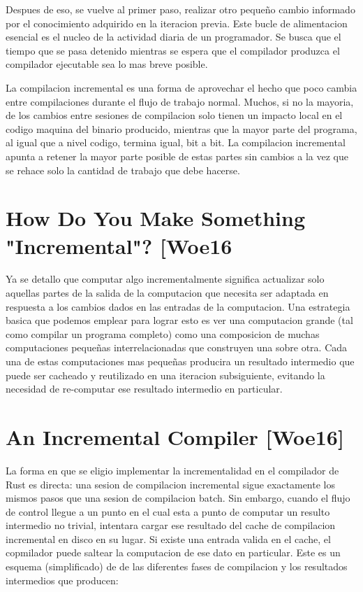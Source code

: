 \documentclass[12pt, a4paper]{report}
\begin{document}
    Despues de eso, se vuelve al primer paso, realizar otro pequeño cambio informado por el conocimiento adquirido en la iteracion previa.
    Este bucle de alimentacion esencial es el nucleo de la actividad diaria de un programador.
    Se busca que el tiempo que se pasa detenido mientras se espera que el compilador produzca el compilador ejecutable sea lo mas breve posible.

    La compilacion incremental es una forma de aprovechar el hecho que poco cambia entre compilaciones durante el flujo de trabajo normal.
    Muchos, si no la mayoria, de los cambios entre sesiones de compilacion solo tienen un impacto local en el codigo maquina del binario producido, mientras que la mayor parte del programa, al igual que a nivel codigo, termina igual, bit a bit.
    La compilacion incremental apunta a retener la mayor parte posible de estas partes sin cambios a la vez que se rehace solo la cantidad de trabajo que debe hacerse.
    \cite{rust_blog_incremental_compilation}

  \section*{How Do You Make Something "Incremental"? [Woe16}

    Ya se detallo que computar algo incrementalmente significa actualizar solo aquellas partes de la salida de la computacion que necesita ser adaptada en respuesta a los cambios dados en las entradas de la computacion.
    Una estrategia basica que podemos emplear para lograr esto es ver una computacion grande (tal como compilar un programa completo) como una composicion de muchas computaciones pequeñas interrelacionadas que construyen una sobre otra.
    Cada una de estas computaciones mas pequeñas producira un resultado intermedio que puede ser cacheado y reutilizado en una iteracion subsiguiente, evitando la necesidad de re-computar ese resultado intermedio en particular.
    \cite{rust_blog_incremental_compilation}

  \section*{An Incremental Compiler [Woe16]}

    La forma en que se eligio implementar la incrementalidad en el compilador de Rust es directa: una sesion de compilacion incremental sigue exactamente los mismos pasos que una sesion de compilacion batch.
    Sin embargo, cuando el flujo de control llegue a un punto en el cual esta a punto de computar un resulto intermedio no trivial, intentara cargar ese resultado del cache de compilacion incremental en disco en su lugar.
    Si existe una entrada valida en el cache, el copmilador puede saltear la computacion de ese dato en particular.
    Este es un esquema (simplificado) de de las diferentes fases de compilacion y los resultados intermedios que producen:
    \cite{rust_blog_incremental_compilation}
\end{document}

